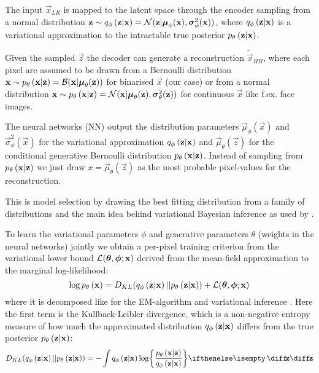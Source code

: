 The input $\vec{x}_{LR}$ is mapped to the latent space through the encoder sampling from a normal distribution
$\bm{\mathrm{z}} \sim q_{\phi}\left(\bm{\mathrm{z}}|\bm{\mathrm{x}}\right) = \mathcal{N}( \bm{\mathrm{z}}|\bm{\mathrm{\mu}}_\phi(\bm{\mathrm{x}}),\bm{\mathrm{\sigma}}^2_\phi(\bm{\mathrm{x}}))$, where $q_{\phi}\left(\bm{\mathrm{z}}|\bm{\mathrm{x}}\right)$ is a variational approximation to the intractable true posterior $p_{\theta}\left(\bm{\mathrm{z}}|\bm{\mathrm{x}}\right)$. 

Given the sampled $\vec{z}$ the decoder can generate a reconstruction $\tilde{\vec{x}}_{HR}$, where each pixel are assumed to be drawn from a Bernoulli distribution $\bm{\mathrm{x}} \sim p_{\theta}\left(\bm{\mathrm{x}}|\bm{\mathrm{z}}\right)=\mathcal{B}( \bm{\mathrm{x}}|\bm{\mathrm{\mu}}_\theta(\bm{\mathrm{z}}))$ for binarised $\vec{x}$ (our case) or from a normal distribution $\bm{\mathrm{x}} \sim p_{\theta}\left(\bm{\mathrm{x}}|\bm{\mathrm{z}}\right)=\mathcal{N}( \bm{\mathrm{x}}|\bm{\mathrm{\mu}}_\theta(\bm{\mathrm{z}}),\bm{\mathrm{\sigma}}^2_\theta(\bm{\mathrm{z}}))$ for continuous $\vec{x}$ like f.ex. face images.

The neural networks (NN) output the distribution parameters $\vec{\mu}_\phi(\vec{x})$ and $\vec{\sigma}^2_\phi(\vec{x})$ for the variational approximation $q_{\phi}\left(\bm{\mathrm{z}}|\bm{\mathrm{x}}\right)$ and $\vec{\mu}_\theta(\vec{z})$ for the conditional generative Bernoulli distribution $p_{\theta}\left(\bm{\mathrm{x}}|\bm{\mathrm{z}}\right)$. Instead of sampling from $p_{\theta}\left(\bm{\mathrm{x}}|\bm{\mathrm{z}}\right)$ we just draw $x=\vec{\mu}_\theta(\vec{z})$ as the most probable pixel-values for the reconstruction. 

This is model selection by drawing the best fitting distribution from a family of distributions and the main idea behind variational Bayesian inference as used by \cite{Kingma2013}. 
 
To learn the variational parameters $\phi$ and generative parameters $\theta$ (weights in the neural networks) jointly we obtain a per-pixel training criterion from the variational lower bound $\mathcal{L}(\bm{\mathrm{\theta}},\bm{\mathrm{\phi}};\bm{\mathrm{x}})$ derived from the mean-field approximation to the marginal log-likelihood:
\begin{equation}
	\log p_{\theta}\left(\bm{\mathrm{x}}\right) = D_{KL}( q_{\phi}\left(\bm{\mathrm{z}}|\bm{\mathrm{x}}\right)||p_{\theta}\left(\bm{\mathrm{z}}|\bm{\mathrm{x}}\right)) + \mathcal{L}(\bm{\mathrm{\theta}},\bm{\mathrm{\phi}};\bm{\mathrm{x}})
\end{equation} 
where it is decomposed like for the EM-algorithm and variational inference \cite[\S10.2]{Bishop2006}. Here the first term is the Kullback-Leibler divergence, which is a non-negative entropy measure of how much the approximated distribution $q_{\phi}\left(\bm{\mathrm{z}}|\bm{\mathrm{x}}\right)$  differs from the true posterior $p_{\theta}\left(\bm{\mathrm{z}}|\bm{\mathrm{x}}\right)$:
\begin{equation}
	D_{KL}\parens{ \enc{\vec{z}|\vec{x}}||\dec{\vec{z}|\vec{x}}} = -\int \enc{\vec{z}|\vec{x}} \log \curlies*{ \frac{\dec{\vec{x}|\vec{z}}}{\enc{\vec{z}|\vec{x}} } } \D{\vec{z}}
\end{equation}

